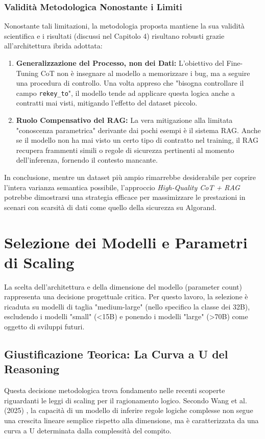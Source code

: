 \subsubsection{Validità Metodologica Nonostante i Limiti}
Nonostante tali limitazioni, la metodologia proposta mantiene la sua validità scientifica e i risultati (discussi nel Capitolo 4) risultano robusti grazie all'architettura ibrida adottata:
\begin{enumerate}
    \item \textbf{Generalizzazione del Processo, non dei Dati:} L'obiettivo del Fine-Tuning CoT non è insegnare al modello a memorizzare i bug, ma a seguire una procedura di controllo. Una volta appreso che "bisogna controllare il campo \texttt{rekey\_to}", il modello tende ad applicare questa logica anche a contratti mai visti, mitigando l'effetto del dataset piccolo.
    \item \textbf{Ruolo Compensativo del RAG:} La vera mitigazione alla limitata "conoscenza parametrica" derivante dai pochi esempi è il sistema RAG. Anche se il modello non ha mai visto un certo tipo di contratto nel training, il RAG recupera frammenti simili o regole di sicurezza pertinenti al momento dell'inferenza, fornendo il contesto mancante.
\end{enumerate}

In conclusione, mentre un dataset più ampio rimarrebbe desiderabile per coprire l'intera varianza semantica possibile, l'approccio \textit{High-Quality CoT + RAG} potrebbe dimostrarsi una strategia efficace per massimizzare le prestazioni in scenari con scarsità di dati come quello della sicurezza su Algorand.

\section{Selezione dei Modelli e Parametri di Scaling}
\label{sec:model_selection}

La scelta dell'architettura e della dimensione del modello (parameter count) rappresenta una decisione progettuale critica. Per questo lavoro, la selezione è ricaduta su modelli di taglia "medium-large" (nello specifico la classe dei 32B), escludendo i modelli "small" (<15B) e ponendo i modelli "large" (>70B) come oggetto di sviluppi futuri.

\subsection{Giustificazione Teorica: La Curva a U del Reasoning}
Questa decisione metodologica trova fondamento nelle recenti scoperte riguardanti le leggi di scaling per il ragionamento logico. Secondo Wang et al. (2025) \cite{wang2025larger}, la capacità di un modello di inferire regole logiche complesse non segue una crescita lineare semplice rispetto alla dimensione, ma è caratterizzata da una curva a U determinata dalla complessità del compito.

